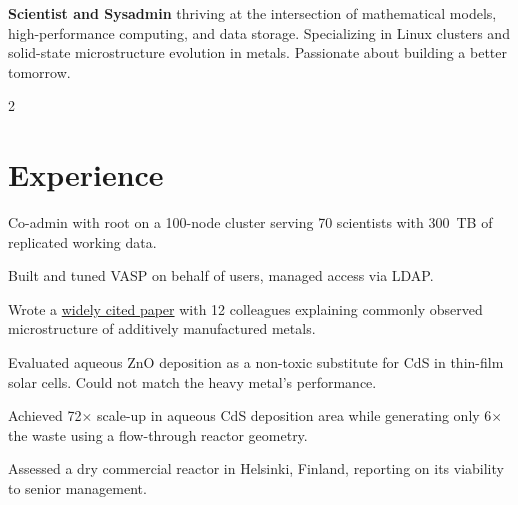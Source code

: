 \documentclass[letterpaper]{plushcv}
\begin{document}

\baselineskip{}
\textbf{Scientist and Sysadmin} thriving at the intersection of mathematical
models, high-performance computing, and data storage.
Specializing in Linux clusters and solid-state microstructure evolution in
metals.
Passionate about building a better tomorrow.


\begin{paracol}{2}

\switchcolumn[0]


\section{Experience}
\begin{tightemize}
\item Co-admin with root on a 100-node cluster serving
      70 scientists with 300~TB of replicated working data.
\item Built and tuned VASP on behalf of users, managed access via LDAP.
\item Wrote a \href{https://doi.org/10.1016/j.actamat.2017.05.003}{widely cited paper}
      with 12 colleagues explaining commonly observed microstructure of additively manufactured metals.
\end{tightemize}
\sectionsep{}

\begin{tightemize}
\item Evaluated aqueous ZnO deposition as a non-toxic substitute for CdS in
      thin-film solar cells. Could not match the heavy metal's performance.
\item Achieved 72$\times$ scale-up in aqueous CdS deposition area while generating only
      6$\times$ the waste using a flow-through reactor geometry.
\item Assessed a dry commercial reactor in Helsinki, Finland, reporting
      on its viability to senior management.
\end{tightemize}
\sectionsep{}


\end{paracol}
\end{document}
